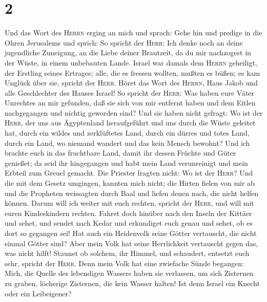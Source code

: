 \hypertarget{section-1}{%
\section{2}\label{section-1}}

 Und das Wort des \textsc{Herrn} erging an mich und
sprach: Gehe hin und predige in die Ohren Jerusalems und sprich:
 So spricht der \textsc{Herr}: Ich denke noch an deine
jugendliche Zuneigung, an die Liebe deiner Brautzeit, da du mir
nachzogest in der Wüste, in einem unbebauten Lande. 
Israel war damals dem \textsc{Herrn} geheiligt, der Erstling seines
Ertrages; alle, die es fressen wollten, mußten es büßen; es kam Unglück
über sie, spricht der \textsc{Herr}.  Höret das Wort des
\textsc{Herrn}, Haus Jakob und alle Geschlechter des Hauses Israel!
 So spricht der \textsc{Herr}: Was haben eure Väter
Unrechtes an mir gefunden, daß sie sich von mir entfernt haben und dem
Eitlen nachgegangen und nichtig geworden sind?  Und sie
haben nicht gefragt: Wo ist der \textsc{Herr}, der uns aus Ägyptenland
heraufgeführt und uns durch die Wüste geleitet hat, durch ein wildes und
zerklüftetes Land, durch ein dürres und totes Land, durch ein Land, wo
niemand wandert und das kein Mensch bewohnt?  Und ich
brachte euch in das fruchtbare Land, damit ihr dessen Früchte und Güter
genießet; da seid ihr hingegangen und habt mein Land verunreinigt und
mein Erbteil zum Greuel gemacht.  Die Priester fragten
nicht: Wo ist der \textsc{Herr}? Und die mit dem Gesetz umgingen,
kannten mich nicht; die Hirten fielen von mir ab und die Propheten
weissagten durch Baal und liefen denen nach, die nicht helfen können.
 Darum will ich weiter mit euch rechten, spricht der
\textsc{Herr}, und will mit euren Kindeskindern rechten. 
Fahret doch hinüber nach den Inseln der Kittäer und sehet, und sendet
nach Kedar und erkundiget euch genau und sehet, ob es dort so gegangen
sei!  Hat auch ein Heidenvolk seine Götter vertauscht,
die nicht einmal Götter sind? Aber mein Volk hat seine Herrlichkeit
vertauscht gegen das, was nicht hilft!  Staunet ob
solchem, ihr Himmel, und schaudert, entsetzt euch sehr, spricht der
\textsc{Herr}.  Denn mein Volk hat eine zwiefache Sünde
begangen: Mich, die Quelle des lebendigen Wassers haben sie verlassen,
um sich Zisternen zu graben, löcherige Zisternen, die kein Wasser
halten!  Ist denn Israel ein Knecht oder ein Leibeigener?
